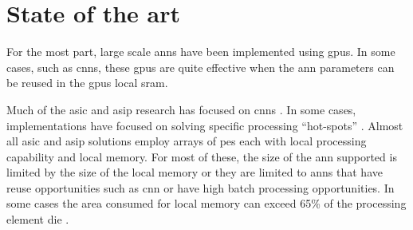 
\chapter{State of the art}
\label{sec:State of the art}

For the most part, large scale \acp{ann} have been implemented using \acp{gpu}.
In some cases, such as \acp{cnn}, these \acp{gpu} are quite effective when the \ac{ann} parameters can be reused in the \acp{gpu} local \ac{sram}.

Much of the \ac{asic} and \ac{asip} research has focused on \acp{cnn} \cite{chen201614}\cite{farabet2011neuflow}\cite{azarkhish2017neurostream}. 
In some cases, implementations have focused on solving specific processing ``hot-spots'' \cite{chen201614}.
Almost all \ac{asic} and \ac{asip} solutions employ arrays of \acp{pe} each with local processing capability and local memory.
For most of these, the size of the \ac{ann} supported is limited by the size of the local memory or they are limited to \acp{ann} that have reuse opportunities such as \ac{cnn} or have high batch processing opportunities.
In some cases \iffalse, as seen in \fref{fig:Example state-of-the-art die}\fi the area consumed for local memory can exceed 65\% of the 
processing element die \cite{kim2016neurocube}\cite{chen2014diannao}.

